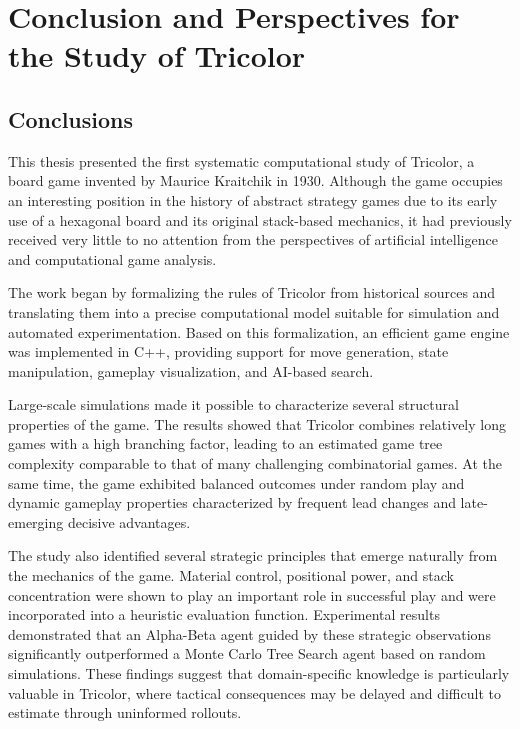 \chapter{Conclusion and Perspectives for the Study of Tricolor}
\label{conclusion}

\section{Conclusions}

This thesis presented the first systematic computational study of Tricolor, a board game invented by Maurice Kraitchik in 1930. Although the game occupies an interesting position in the history of abstract strategy games due to its early use of a hexagonal board and its original stack-based mechanics, it had previously received very little to no attention from the perspectives of artificial intelligence and computational game analysis.

The work began by formalizing the rules of Tricolor from historical sources and translating them into a precise computational model suitable for simulation and automated experimentation. Based on this formalization, an efficient game engine was implemented in C++, providing support for move generation, state manipulation, gameplay visualization, and AI-based search.

Large-scale simulations made it possible to characterize several structural properties of the game. The results showed that Tricolor combines relatively long games with a high branching factor, leading to an estimated game tree complexity comparable to that of many challenging combinatorial games. At the same time, the game exhibited balanced outcomes under random play and dynamic gameplay properties characterized by frequent lead changes and late-emerging decisive advantages.

The study also identified several strategic principles that emerge naturally from the mechanics of the game. Material control, positional power, and stack concentration were shown to play an important role in successful play and were incorporated into a heuristic evaluation function. Experimental results demonstrated that an Alpha-Beta agent guided by these strategic observations significantly outperformed a Monte Carlo Tree Search agent based on random simulations. These findings suggest that domain-specific knowledge is particularly valuable in Tricolor, where tactical consequences may be delayed and difficult to estimate through uninformed rollouts.


